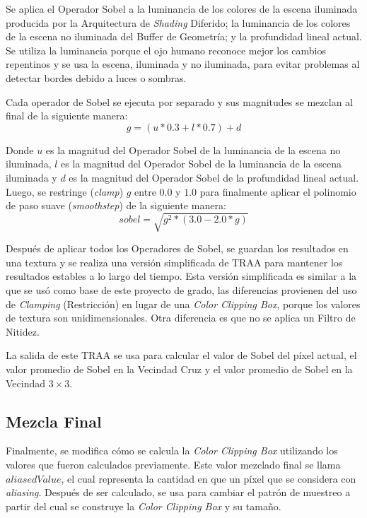 \documentclass[pregrado]{tesis-usb} %
\begin{document}
Se aplica el Operador Sobel a la luminancia de los colores de la escena iluminada producida por la Arquitectura de \textit{Shading} Diferido; la luminancia de los colores de la escena no iluminada del Buffer de Geometría; y la profundidad lineal actual. Se utiliza la luminancia porque el ojo humano reconoce mejor los cambios repentinos y se usa la escena, iluminada y no iluminada, para evitar problemas al detectar bordes debido a luces o sombras.

Cada operador de Sobel se ejecuta por separado y sus magnitudes se mezclan al final de la siguiente manera:
\begin{equation} \label{eq:sobel_g}
	g=(u*0.3 +l*0.7)+d 
\end{equation}

Donde $u$ es la magnitud del Operador Sobel de la luminancia de la escena no iluminada, $l$ es la magnitud del Operador Sobel de la luminancia de la escena iluminada y $d$ es la magnitud del Operador Sobel de la profundidad lineal actual. \\

Luego, se restringe (\textit{clamp}) $g$ entre $0.0$ y $1.0$ para finalmente aplicar el polinomio de paso suave (\textit{smoothstep}) de la siguiente manera:
\begin{equation} \label{eq:sobel_sqrt}
sobel=\sqrt{g^2*(3.0-2.0*g)} 
\end{equation}

Después de aplicar todos los Operadores de Sobel, se guardan los resultados en una textura y se realiza una versión simplificada de TRAA para mantener los resultados estables a lo largo del tiempo. Esta versión simplificada es similar a la que se usó como base de este proyecto de grado, las diferencias provienen del uso de \textit{Clamping} (Restricción) en lugar de una \textit{Color Clipping Box}, porque los valores de textura son unidimensionales. Otra diferencia es que no se aplica un Filtro de Nitidez.

La salida de este TRAA se usa para calcular el valor de Sobel del píxel actual, el valor promedio de Sobel en la Vecindad Cruz y el valor promedio de Sobel en la Vecindad $3\times 3$.

\subsection{Mezcla Final}
Finalmente, se modifica cómo se calcula la \textit{Color Clipping Box} utilizando los valores que fueron calculados previamente. Este valor mezclado final se llama $aliasedValue$, el cual representa la cantidad en que un píxel que se considera con \textit{aliasing}. Después de ser calculado, se usa para cambiar el patrón de muestreo a partir del cual se construye la \textit{Color Clipping Box} y su tamaño.
\end{document}
